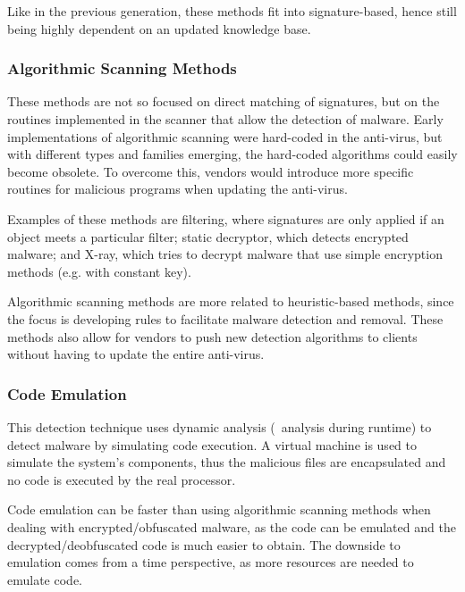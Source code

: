 \medskip

Like in the previous generation, these methods fit into signature-based, hence still being highly dependent on an updated knowledge base.

\subsubsection{Algorithmic Scanning Methods}
\label{subsection:algorithmic_scanning}

These methods are not so focused on direct matching of signatures, but on the routines implemented in the scanner that allow the detection of malware.
Early implementations of algorithmic scanning were hard-coded in the anti-virus, but with different types and families emerging, the hard-coded algorithms could easily become obsolete.
To overcome this, vendors would introduce more specific routines for malicious programs when updating the anti-virus.

Examples of these methods are filtering, where signatures are only applied if an object meets a particular filter; static decryptor, which detects encrypted malware; and X-ray, which tries to decrypt malware that use simple encryption methods (e.g.  with constant key).

Algorithmic scanning methods are more related to heuristic-based methods, since the focus is developing rules to facilitate malware detection and removal.
These methods also allow for vendors to push new detection algorithms to clients without having to update the entire anti-virus.

\subsubsection{Code Emulation}
\label{subsection:code_emulation}

This detection technique uses dynamic analysis (\ie\ analysis during runtime) to detect malware by simulating code execution.
A virtual machine is used to simulate the system's components, thus the malicious files are encapsulated and no code is executed by the real processor.

Code emulation can be faster than using algorithmic scanning methods when dealing with encrypted/obfuscated malware, as the code can be emulated and the decrypted/deobfuscated code is much easier to obtain.
The downside to emulation comes from a time perspective, as more resources are needed to emulate code.

